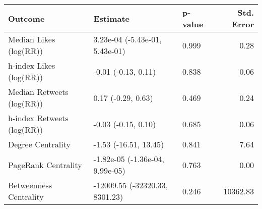\begin{table}[ht]
\centering
\begin{tabular}{lllr}
  \hline
Outcome & Estimate & p-value & Std. Error \\ 
  \hline
Median Likes (log(RR)) & 3.23e-04 (-5.43e-01, 5.43e-01) & 0.999 & 0.28 \\ 
  h-index Likes (log(RR)) & -0.01 (-0.13, 0.11) & 0.838 & 0.06 \\ 
  Median Retweets (log(RR)) & 0.17 (-0.29, 0.63) & 0.469 & 0.24 \\ 
  h-index Retweets (log(RR)) & -0.03 (-0.15, 0.10) & 0.685 & 0.06 \\ 
  Degree Centrality & -1.53 (-16.51, 13.45) & 0.841 & 7.64 \\ 
  PageRank Centrality & -1.82e-05 (-1.36e-04, 9.99e-05) & 0.763 & 0.00 \\ 
  Betweenness Centrality & -12009.55 (-32320.33, 8301.23) & 0.246 & 10362.83 \\ 
   \hline
\end{tabular}
\end{table}
